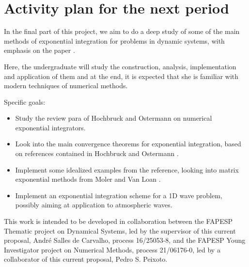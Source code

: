 \chapter{Activity plan for the next period}\label{chp:plano}

In the final part of this project, we aim to do a deep study of some of the main methods of exponential integration for problems in dynamic systems, with emphasis on the paper \cite{Hochbruck2010}.

Here, the undergraduate will study the construction, analysis, implementation and application of them and at the end, it is expected that she is familiar with modern techniques of numerical methods.

Specific goals:

\begin{itemize}
    \item Study the review para of Hochbruck and Ostermann \cite{Hochbruck2010} on numerical exponential integrators.
    \item Look into the main convergence theorems for exponential integration, based on references contained in Hochbruck and Ostermann \cite{Hochbruck2010}.
    \item Implement some idealized examples from the reference, looking into matrix exponential methods from Moler and Van Loan \cite{Moler2003}.
    \item Implement an exponential integration scheme for a 1D wave problem, possibly aiming at application to atmospheric waves.
\end{itemize}

This work is intended to be developed in collaboration between the FAPESP Thematic project on Dynamical Systems, led by the supervisor of this current proposal, André Salles de Carvalho, process 16/25053-8, and the FAPESP Young Investigator project on Numerical Methods, process 21/06176-0, led by a collaborator of this current proposal, Pedro S. Peixoto.